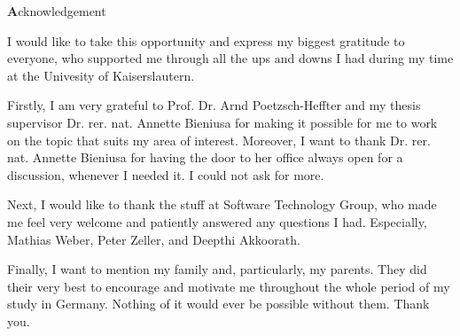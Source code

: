 
\begin{center}
{\Large \textbf Acknowledgement}
\end{center}
\vspace{1cm}

I would like to take this opportunity and express my biggest gratitude to everyone, who supported me through all the ups and downs I had during my time at the Univesity of Kaiserslautern. 

Firstly, I am very grateful to Prof. Dr. Arnd Poetzsch-Heffter and my thesis supervisor Dr. rer. nat. Annette Bieniusa for making it possible for me to work on the topic that suits my area of interest. Moreover, I want to thank Dr. rer. nat. Annette Bieniusa for having the door to her office always open for a discussion, whenever I needed it. I could not ask for more.

Next, I would like to thank the stuff at Software Technology Group, who made me feel very welcome and patiently answered any questions I had. Especially, Mathias Weber, Peter Zeller, and Deepthi Akkoorath.

Finally, I want to mention my family and, particularly, my parents. They did their very best to encourage and motivate me throughout the whole period of my study in Germany. Nothing of it would ever be possible without them. Thank you.